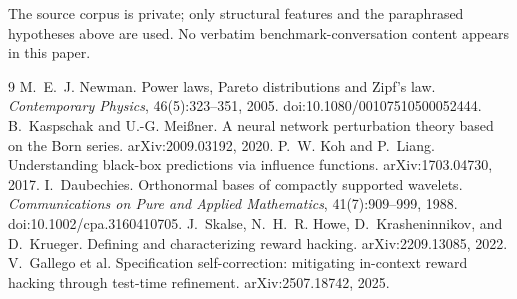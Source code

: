 \documentclass[11pt]{article}
\begin{document}
The source corpus is private; only structural features and the paraphrased
hypotheses above are used. No verbatim benchmark-conversation content appears in
this paper.

\begin{thebibliography}{9}
M.~E.~J. Newman. Power laws, Pareto distributions and Zipf's law.
\emph{Contemporary Physics}, 46(5):323--351, 2005. doi:10.1080/00107510500052444.
B.~Kaspschak and U.-G. Meißner. A neural network perturbation theory based on
the Born series. arXiv:2009.03192, 2020.
P.~W. Koh and P.~Liang. Understanding black-box predictions via influence
functions. arXiv:1703.04730, 2017.
I.~Daubechies. Orthonormal bases of compactly supported wavelets.
\emph{Communications on Pure and Applied Mathematics}, 41(7):909--999, 1988.
doi:10.1002/cpa.3160410705.
J.~Skalse, N.~H.~R. Howe, D.~Krasheninnikov, and D.~Krueger. Defining and
characterizing reward hacking. arXiv:2209.13085, 2022.
V.~Gallego et al. Specification self-correction: mitigating in-context reward
hacking through test-time refinement. arXiv:2507.18742, 2025.
\end{thebibliography}
\end{document}
